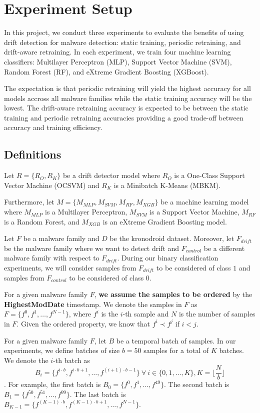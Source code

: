 \section{Experiment Setup\label{sec:setup}}
In this project, we conduct three experiments to evaluate the benefits of using
drift detection for malware detection: static training, periodic retraining,
and drift-aware retraining. In each experiment, we train four machine learning classifiers:
Multilayer Perceptron (MLP), Support Vector Machine (SVM), Random Forest (RF),
and eXtreme Gradient Boosting (XGBoost).

The expectation is that periodic retraining will yield the highest accuracy
for all models accross all malware families while the static training accuracy
will be the lowest. The drift-aware retraining accuracy is expected to be
between the static training and periodic retraining accuracies providing
a good trade-off between accuracy and training efficiency.

\subsection{Definitions}

Let $R = \{R_{O}, R_{K}\}$ be a drift detector model where $R_{O}$ is a
One-Class Support Vector Machine (OCSVM) and $R_{K}$ is a Minibatch K-Means (MBKM).

Furthermore, let $M = \{M_{MLP}, M_{SVM}, M_{RF}, M_{XGB}\}$ be
a machine learning model where $M_{MLP}$ is a Multilayer Perceptron,
$M_{SVM}$ is a Support Vector Machine, $M_{RF}$ is a Random Forest,
and $M_{XGB}$ is an eXtreme Gradient Boosting model.

Let $F$ be a malware family and $D$ be the kronodroid dataset. Moreover,
let $F_{drift}$ be the malware family where we want to detect drift and
$F_{control}$ be a different malware family with respect to $F_{drift}$.
During our binary classification experiments, we will consider samples from $F_{drift}$
to be considered of class $1$ and samples from $F_{control}$ to be considered
of class $0$.

For a given malware family $F$, \textbf{we assume the samples to be ordered}
by the \textbf{HighestModDate} timestamp.
We denote the samples in $F$ as
$F = \{f^{0}, f^{1}, \ldots, f^{N-1}\}$, where $f^{i}$ is the $i$-th sample
and $N$ is the number of samples in $F$. Given the ordered property,
we know that $f^{i} \prec f^{j}$ if $i < j$.

For a given malware family $F$,
let $B$ be a temporal batch of samples. In our experiments, we define batches
of size $b = 50$ samples for a total of $K$ batches. We denote the $i$-th batch as
$$B_{i} = \{f^{i \cdot b}, f^{i \cdot b + 1}, \ldots, f^{(i+1) \cdot b - 1}\}
~\forall~ i \in \{0, 1, \ldots,  K\}, K = \lfloor \frac{N}{b} \rfloor$$.
For example, the first batch is $B_{0} = \{f^{0}, f^{1}, \ldots, f^{49}\}$.
The second batch is $B_{1} = \{f^{50}, f^{51}, \ldots, f^{99}\}$.
The last batch is $B_{K-1} = \{f^{(K-1) \cdot b}, f^{(K-1) \cdot b + 1}, \ldots, f^{N-1}\}$.


